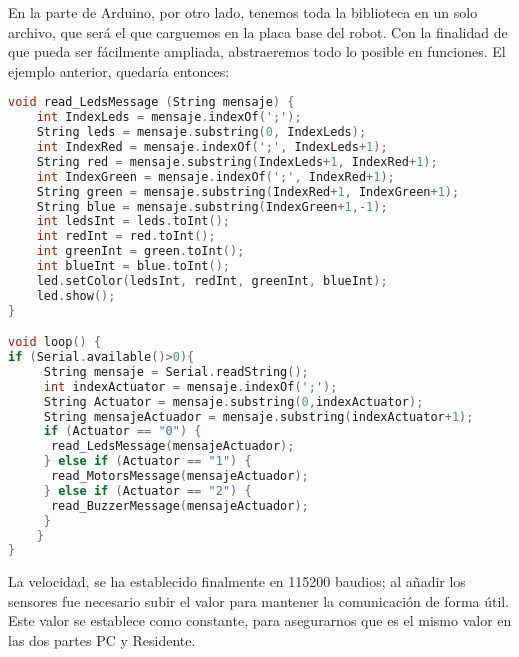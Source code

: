 En la parte de Arduino, por otro lado, tenemos toda la biblioteca en un solo archivo, que será el que carguemos en la placa base del robot. Con la finalidad de que pueda ser fácilmente ampliada, abstraeremos todo lo posible en funciones. El ejemplo anterior, quedaría entonces:
\begin{lstlisting}[language=C]	
void read_LedsMessage (String mensaje) {
	int IndexLeds = mensaje.indexOf(';');
	String leds = mensaje.substring(0, IndexLeds);
	int IndexRed = mensaje.indexOf(';', IndexLeds+1);
	String red = mensaje.substring(IndexLeds+1, IndexRed+1);
	int IndexGreen = mensaje.indexOf(';', IndexRed+1);
	String green = mensaje.substring(IndexRed+1, IndexGreen+1);
	String blue = mensaje.substring(IndexGreen+1,-1);
	int ledsInt = leds.toInt();
	int redInt = red.toInt();
	int greenInt = green.toInt();
	int blueInt = blue.toInt();
	led.setColor(ledsInt, redInt, greenInt, blueInt);
	led.show();
}

void loop() {
if (Serial.available()>0){
	 String mensaje = Serial.readString();
	 int indexActuator = mensaje.indexOf(';');
	 String Actuator = mensaje.substring(0,indexActuator);
	 String mensajeActuador = mensaje.substring(indexActuator+1);
	 if (Actuator == "0") {
	  read_LedsMessage(mensajeActuador);
	 } else if (Actuator == "1") {
	  read_MotorsMessage(mensajeActuador);
	 } else if (Actuator == "2") {
	  read_BuzzerMessage(mensajeActuador);
	 }
	}
}
\end{lstlisting}

La velocidad, se ha establecido finalmente en 115200 baudios; al añadir los sensores fue necesario subir el valor para mantener la comunicación de forma útil. Este valor se establece como constante, para asegurarnos que es el mismo valor en las dos partes PC y Residente. 

